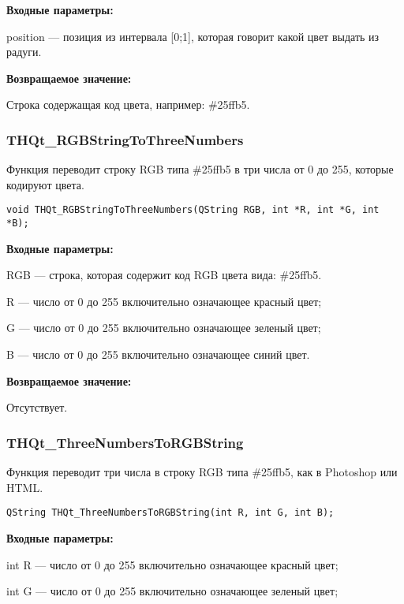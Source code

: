 \documentclass[a4paper,12pt]{article}
\begin{document}
\textbf{Входные параметры:}

position --- позиция из интервала [0;1], которая говорит какой цвет выдать из радуги.

\textbf{Возвращаемое значение:}

Строка содержащая код цвета, например: \#25ffb5.


\subsubsection{THQt\_RGBStringToThreeNumbers}\label{THQt_RGBStringToThreeNumbers}

Функция переводит строку RGB типа \#25ffb5 в три числа от 0 до 255, которые кодируют  цвета.


\begin{lstlisting}[label=code_syntax_THQt_RGBStringToThreeNumbers,caption=Синтаксис]
void THQt_RGBStringToThreeNumbers(QString RGB, int *R, int *G, int *B);
\end{lstlisting}

\textbf{Входные параметры:}

RGB --- строка, которая содержит код RGB цвета вида: \#25ffb5.
 
    R --- число от 0 до 255 включительно означающее красный цвет;
 
    G --- число от 0 до 255 включительно означающее зеленый цвет;
 
    B --- число от 0 до 255 включительно означающее синий цвет.

\textbf{Возвращаемое значение:}

Отсутствует.


\subsubsection{THQt\_ThreeNumbersToRGBString}\label{THQt_ThreeNumbersToRGBString}

Функция переводит три числа в строку RGB типа \#25ffb5, как в Photoshop или HTML.


\begin{lstlisting}[label=code_syntax_THQt_ThreeNumbersToRGBString,caption=Синтаксис]
QString THQt_ThreeNumbersToRGBString(int R, int G, int B);
\end{lstlisting}

\textbf{Входные параметры:}

int R --- число от 0 до 255 включительно означающее красный цвет;
 
    int G --- число от 0 до 255 включительно означающее зеленый цвет;
 
\end{document}
